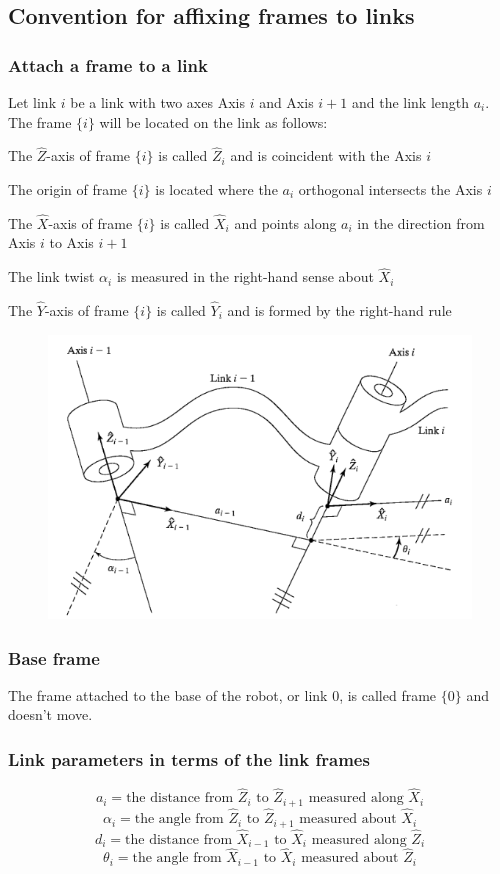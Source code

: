 \documentclass[10pt,a4paper]{article}
\begin{document}
\subsection{Convention for affixing frames to links}
\subsubsection{Attach a frame to a link}
Let link $i$ be a link with two axes Axis $i$ and Axis ${i+1}$ and the link length $a_i$. \\
The frame $\{i\}$ will be located on the link as follows:
\begin{description}
	\item The $\hat{Z}$-axis of frame $\{i\}$ is called $\hat{Z}_i$ and is coincident with the Axis $i$
	\item The origin of frame $\{i\}$ is located where the $a_i$ orthogonal intersects the Axis $i$
	\item The $\hat{X}$-axis of frame $\{i\}$ is called $\hat{X}_i$ and points along $a_i$ in the direction from Axis $i$ to Axis $i+1$
	\item The link twist $\alpha_i$ is measured in the right-hand sense about $\hat{X}_i$
	\item The $\hat{Y}$-axis of frame $\{i\}$ is called $\hat{Y}_i$ and is formed by the right-hand rule
\end{description}

\begin{figure}[H]
	\includegraphics[width=0.5\columnwidth]{imgs/link_frame.png}
\end{figure}

\subsubsection{Base frame}
The frame attached to the base of the robot, or link 0, is called frame $\{0\}$ and doesn't move.

\subsubsection{Link parameters in terms of the link frames}
$$
	a_i = \text{the distance from } \hat{Z}_i \text{ to } \hat{Z}_{i+1} \text{ measured along } \hat{X}_i
$$
$$
	\alpha_i = \text{the angle from } \hat{Z}_i \text{ to } \hat{Z}_{i+1} \text{ measured about } \hat{X}_i
$$
$$
	d_i = \text{the distance from } \hat{X}_{i-1} \text{ to } \hat{X}_i \text{ measured along } \hat{Z}_i
$$
$$
	\theta_i = \text{the angle from } \hat{X}_{i-1} \text{ to } \hat{X}_i \text{ measured about } \hat{Z}_i
$$
\end{document}
